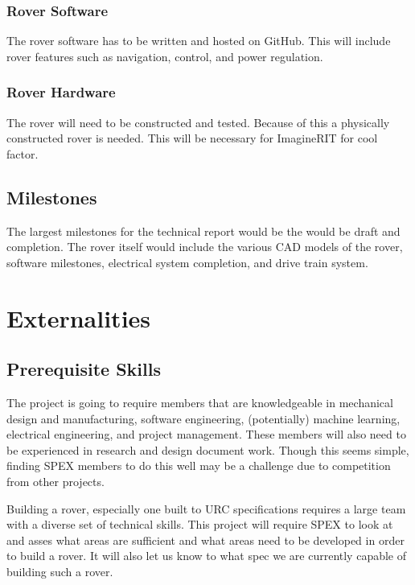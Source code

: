 \documentclass[conference]{IEEEtran} %
\begin{document}
\subsubsection{Rover Software}
\label{roversoftware}
The rover software has to be written and hosted on GitHub. This will include rover features such as navigation, control, and power regulation. 

\subsubsection{Rover Hardware}
\label{roverhardware}
The rover will need to be constructed and tested. Because of this a physically constructed rover is needed. This will be necessary for ImagineRIT for cool factor. 

\subsection{Milestones}
\label{subsec:milestones}
The largest milestones for the technical report would be the would be draft and completion. 
The rover itself would include the various CAD models of the rover, software milestones, electrical system completion, and drive train system. 

\section{Externalities}
\subsection{Prerequisite Skills}
The project is going to require members that are knowledgeable in mechanical design and manufacturing, software engineering, (potentially) machine learning, electrical engineering, and project management. These members will also need to be experienced in research and design document work. Though this seems simple, finding SPEX members to do this well may be a challenge due to competition from other projects. 

Building a rover, especially one built to URC specifications requires a large team with a diverse set of technical skills. 
This project will require SPEX to look at and asses what areas are sufficient and what areas need to be developed in order to build a rover. 
It will also let us know to what spec we are currently capable of building such a rover. 
\end{document}
